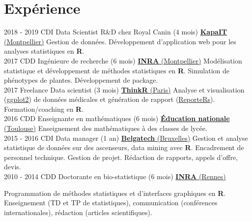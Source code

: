 \documentclass[letterpaper]{twentysecondcv} %
\begin{document}
\makeprofile %


\section{Expérience}

\begin{twenty} %
\twentyitem
    	{2018 - 2019}
		{CDI}
        {Data Scientist R\&D chez Royal Canin \textnormal{(4 mois)}}
        {\href{http://www.kapa-it.fr/}{\textbf{KapaIT} (Montpellier)}}
        {}
        {
        Gestion de données. Développement d'application web pour les analyses statistiques en \textbf{R}.
        }
        \\
\twentyitem
    	{2017}
		{CDD}
        {Ingénieure de recherche \textnormal{(6 mois)}}
        {\href{https://www6.montpellier.inra.fr/mistea/}{\textbf{INRA} (Montpellier)}}
        {}
        {
        Modélisation statistique et développement de méthodes statistiques en \textbf{R}. 
        Simulation de phénotypes de plantes. Développement de package.
        }
        \\
	\twentyitem
    	{2017}
		{Freelance}
        {Data scientist \textnormal{(3 mois)}}
        {\href{https://thinkr.fr/}{\textbf{ThinkR} (Paris)}}
        {}
        {
        {
        Analyse et visualisation (\href{https://ggplot2.tidyverse.org/}{ggplot2}) de données médicales et génération de rapport 
        (\href{https://davidgohel.github.io/ReporteRs/}{ReporteRs}). Formation/coaching en \textbf{R}.
        }
        }
    \\   
    \twentyitem
   		{2016}
		{CDD}
        {Enseignante en mathématiques \textnormal{(6 mois)}}
        {\href{http://www.ac-toulouse.fr/}{\textbf{Éducation nationale} (Toulouse)}}
        {}
        {
        Enseignement des mathématiques à des classes de lycée.
        }
     \\
     \twentyitem
   		{2015 - 2016}
		{CDI}
        {Data manager \textnormal{(1 an)}}
        {\href{https://www.belgatech-engineering.com/}{\textbf{Belgatech} (Bruxelles)}}
        {}
        {
        Gestion et analyse statistique de données sur des ascenseurs, data mining avec \textbf{R}. 
        Encadrement de personnel technique. Gestion de projet. Rédaction de rapports, appels d’offre, devis.
    	}
    	    \\   
    \twentyitem
   		{2010 - 2014}
		{CDD}
        {Doctorante en bio-statistique \textnormal{(6 mois)}}
        {\href{https://www6.rennes.inra.fr/pegase}{\textbf{INRA} (Rennes)}}
        {}
        {Programmation de méthodes statistiques et d’interfaces graphiques en \textbf{R}. Enseignement (TD et TP de statistiques), communication (conférences internationales), rédaction (articles scientifiques).
    
}
\end{twenty}
\end{document}
